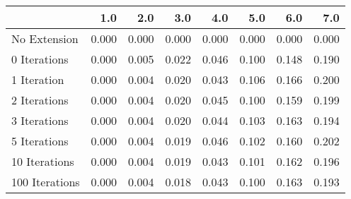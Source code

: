 \begin{tabular}{lrrrrrrr}
\toprule
{} &   1.0 &   2.0 &   3.0 &   4.0 &   5.0 &   6.0 &   7.0 \\
\midrule
No Extension   & 0.000 & 0.000 & 0.000 & 0.000 & 0.000 & 0.000 & 0.000 \\
0 Iterations   & 0.000 & 0.005 & 0.022 & 0.046 & 0.100 & 0.148 & 0.190 \\
1 Iteration    & 0.000 & 0.004 & 0.020 & 0.043 & 0.106 & 0.166 & 0.200 \\
2 Iterations   & 0.000 & 0.004 & 0.020 & 0.045 & 0.100 & 0.159 & 0.199 \\
3 Iterations   & 0.000 & 0.004 & 0.020 & 0.044 & 0.103 & 0.163 & 0.194 \\
5 Iterations   & 0.000 & 0.004 & 0.019 & 0.046 & 0.102 & 0.160 & 0.202 \\
10 Iterations  & 0.000 & 0.004 & 0.019 & 0.043 & 0.101 & 0.162 & 0.196 \\
100 Iterations & 0.000 & 0.004 & 0.018 & 0.043 & 0.100 & 0.163 & 0.193 \\
\bottomrule
\end{tabular}
